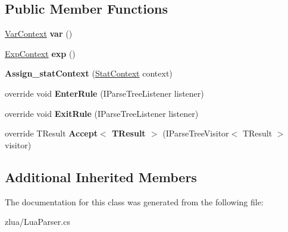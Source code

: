 \subsection*{Public Member Functions}
\begin{DoxyCompactItemize}
\item 
\mbox{\label{classzlua_1_1_lua_parser_1_1_assign__stat_context_a60721a0facc985002939adddaefb531f}} 
\mbox{\hyperlink{classzlua_1_1_lua_parser_1_1_var_context}{Var\+Context}} {\bfseries var} ()
\item 
\mbox{\label{classzlua_1_1_lua_parser_1_1_assign__stat_context_ac699ba21b9c4fb5905cf3685f1745418}} 
\mbox{\hyperlink{classzlua_1_1_lua_parser_1_1_exp_context}{Exp\+Context}} {\bfseries exp} ()
\item 
\mbox{\label{classzlua_1_1_lua_parser_1_1_assign__stat_context_a398dfb153417334b7945f9acadefcc90}} 
{\bfseries Assign\+\_\+stat\+Context} (\mbox{\hyperlink{classzlua_1_1_lua_parser_1_1_stat_context}{Stat\+Context}} context)
\item 
\mbox{\label{classzlua_1_1_lua_parser_1_1_assign__stat_context_a124126deff881ab0cfd01d15e65827b4}} 
override void {\bfseries Enter\+Rule} (I\+Parse\+Tree\+Listener listener)
\item 
\mbox{\label{classzlua_1_1_lua_parser_1_1_assign__stat_context_a8fbb2a66611388da592a63c2ee7b55ba}} 
override void {\bfseries Exit\+Rule} (I\+Parse\+Tree\+Listener listener)
\item 
\mbox{\label{classzlua_1_1_lua_parser_1_1_assign__stat_context_a55a5ccc6200ac036a2b93cb5ae6f7844}} 
override T\+Result {\bfseries Accept$<$ T\+Result $>$} (I\+Parse\+Tree\+Visitor$<$ T\+Result $>$ visitor)
\end{DoxyCompactItemize}
\subsection*{Additional Inherited Members}


The documentation for this class was generated from the following file\+:\begin{DoxyCompactItemize}
\item 
zlua/Lua\+Parser.\+cs\end{DoxyCompactItemize}
